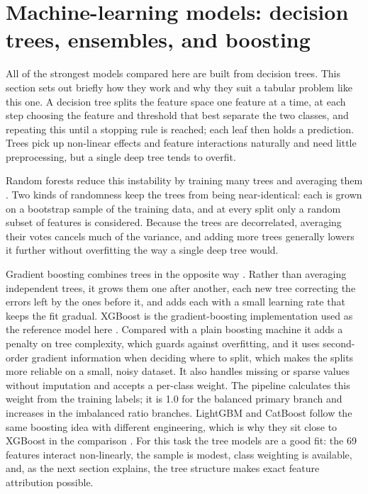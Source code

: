 \documentclass[12pt,letterpaper,oneside,openany]{book}
\begin{document}
\section{Machine-learning models: decision trees, ensembles, and boosting}
\label{sec:methods_models_background}

All of the strongest models compared here are built from decision trees. This section sets out briefly how they work and why they suit a tabular problem like this one. A decision tree splits the feature space one feature at a time, at each step choosing the feature and threshold that best separate the two classes, and repeating this until a stopping rule is reached; each leaf then holds a prediction. Trees pick up non-linear effects and feature interactions naturally and need little preprocessing, but a single deep tree tends to overfit.

Random forests reduce this instability by training many trees and averaging them \citep{breiman2001random}. Two kinds of randomness keep the trees from being near-identical: each is grown on a bootstrap sample of the training data, and at every split only a random subset of features is considered. Because the trees are decorrelated, averaging their votes cancels much of the variance, and adding more trees generally lowers it further without overfitting the way a single deep tree would.

Gradient boosting combines trees in the opposite way \citep{friedman2001greedy}. Rather than averaging independent trees, it grows them one after another, each new tree correcting the errors left by the ones before it, and adds each with a small learning rate that keeps the fit gradual. XGBoost is the gradient-boosting implementation used as the reference model here \citep{chen2016xgboost}. Compared with a plain boosting machine it adds a penalty on tree complexity, which guards against overfitting, and it uses second-order gradient information when deciding where to split, which makes the splits more reliable on a small, noisy dataset. It also handles missing or sparse values without imputation and accepts a per-class weight. The pipeline calculates this weight from the training labels; it is 1.0 for the balanced primary branch and increases in the imbalanced ratio branches. LightGBM and CatBoost follow the same boosting idea with different engineering, which is why they sit close to XGBoost in the comparison \citep{ke2017lightgbm,prokhorenkova2018catboost}. For this task the tree models are a good fit: the 69 features interact non-linearly, the sample is modest, class weighting is available, and, as the next section explains, the tree structure makes exact feature attribution possible.
\end{document}
